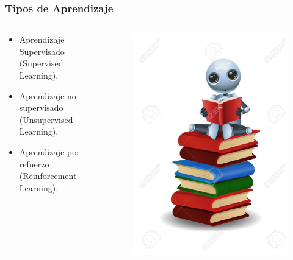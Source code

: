 \documentclass[10pt]{beamer}
\begin{document}
\begin{frame}
    \frametitle{Tipos de Aprendizaje}
    \begin{columns}
        \begin{column}{0.5\textwidth}
          \begin{itemize}
              \item Aprendizaje Supervisado (Supervised Learning).
              \item Aprendizaje no supervisado (Unsupervised Learning).
              \item Aprendizaje por refuerzo (Reinforcement Learning).
          \end{itemize}
        \end{column}
        \begin{column}{0.5\textwidth}
          \begin{figure}[!h] 
            \centering
            \includegraphics[width=1\textwidth]{img/robot2}
          \end{figure}  
        \end{column}
      \end{columns}

\end{frame}
\end{document}
